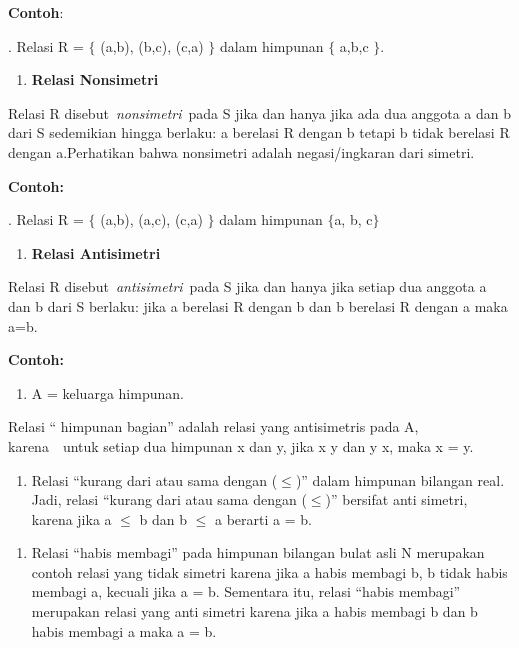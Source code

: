 \documentclass[11pt,fleqn]{book} %
\begin{document}
\begin{myEnumerate}
\begin{itemize}
\noindent 

\noindent \textbf{Contoh}:

\noindent 

. Relasi R = $\{$ (a,b), (b,c), (c,a) $\}$ dalam himpunan $\{$ a,b,c $\}$.

\noindent \textbf{}

\begin{enumerate}
\item \textbf{ Relasi Nonsimetri}
\end{enumerate}

\noindent Relasi R disebut~\textit{nonsimetri}~pada S jika dan hanya jika ada dua anggota a dan b dari S sedemikian hingga berlaku: a berelasi R dengan b tetapi b tidak berelasi R dengan a.Perhatikan bahwa nonsimetri adalah negasi/ingkaran dari simetri.

\noindent \textbf{Contoh:}

. Relasi R = $\{$ (a,b), (a,c), (c,a) $\}$ dalam himpunan $\{$a, b, c$\}$

\noindent \textbf{}

\begin{enumerate}
\item \textbf{ Relasi Antisimetri}
\end{enumerate}

\noindent Relasi R disebut~\textit{antisimetri}~pada S jika dan hanya jika setiap dua anggota a dan b dari S berlaku: jika a berelasi R dengan b dan b berelasi R dengan a maka a=b.

\noindent \textbf{Contoh:}

\begin{enumerate}
\item \textbf{ }A = keluarga himpunan. 
\end{enumerate}

\noindent Relasi `` himpunan bagian'' adalah relasi yang antisimetris pada A, karena~~untuk setiap dua himpunan x dan y, jika x y dan y x, maka x = y.

\begin{enumerate}
\item  Relasi ``kurang dari atau sama dengan ($\mathrm{\le}$)'' dalam himpunan bilangan real. Jadi, relasi ``kurang dari atau sama dengan ($\mathrm{\le}$)'' bersifat anti simetri, karena jika a $\mathrm{\le}$ b dan b $\mathrm{\le}$ a berarti a = b.
\end{enumerate}

\noindent 

\begin{enumerate}
\item  Relasi ``habis membagi'' pada himpunan bilangan bulat asli N merupakan contoh relasi yang tidak simetri karena jika a habis membagi b, b tidak habis membagi a, kecuali jika a = b. Sementara itu, relasi ``habis membagi'' merupakan relasi yang anti simetri karena jika a habis membagi b dan b habis membagi a maka a = b.
\end{enumerate}


\end{itemize}
\end{myEnumerate}
\end{document}
